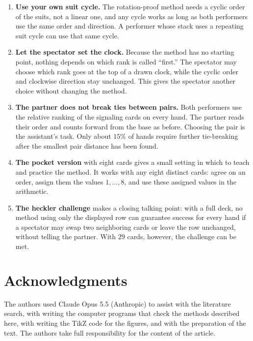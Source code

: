 \documentclass[11pt]{article}
\begin{document}
\begin{enumerate}
\renewcommand{\labelenumi}{(\roman{enumi})}

\item \textbf{Use your own suit cycle.}
The rotation-proof method needs a cyclic order of the suits,
not a linear one, and any cycle works as long as both performers
use the same order and direction. A performer whose stack uses
a repeating suit cycle can use that same cycle.

\item \textbf{Let the spectator set the clock.}
Because the method has no starting point, nothing depends on
which rank is called ``first.'' The spectator may choose which
rank goes at the top of a drawn clock, while the cyclic order
and clockwise direction stay unchanged. This gives the spectator
another choice without changing the method.

\item \textbf{The partner does not break ties between pairs.}
Both performers use the relative ranking of the signaling cards
on every hand. The partner reads their order and counts forward
from the base as before. Choosing the pair is the assistant's
task. Only about $15\%$ of hands require further tie-breaking
after the smallest pair distance has been found.

\item \textbf{The pocket version}
with eight cards gives a small setting in which to teach and
practice the method. It works with any eight distinct cards:
agree on an order, assign them the values $1,\ldots,8$, and
use these assigned values in the arithmetic.

\item \textbf{The heckler challenge}
makes a closing talking point: with a full deck, no method using
only the displayed row can guarantee success for every hand if
a spectator may swap two neighboring cards or leave the row
unchanged, without telling the partner. With $29$ cards, however,
the challenge can be met.
\end{enumerate}



\section*{Acknowledgments}

The authors used Claude Opus 5.5 (Anthropic) to assist with the literature search, with writing the computer programs that check the methods described here, with writing the TikZ code for the figures, and with the preparation of the text. The authors take full responsibility for the content of the article.
\end{document}
